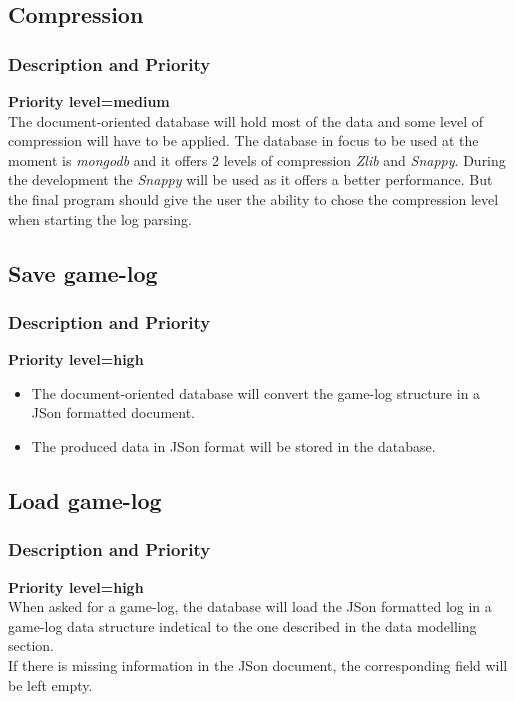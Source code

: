 \documentclass{scrreprt}
\begin{document}
\subsection{Compression}
\subsubsection{Description and Priority}
\textbf{Priority level=medium}\\
The document-oriented database will hold most of the data and some level of compression
will have to be applied.
The database in focus to be used at the moment is \textit{mongodb} and it offers
2 levels of compression \textit{Zlib} and \textit{Snappy}.
During the development the \textit{Snappy} will be used as it offers a better
performance.
But the final program should give the user the ability to chose the compression
level when starting the log parsing.


\subsection{Save game-log}
\subsubsection{Description and Priority}
\textbf{Priority level=high}\\
\begin{itemize}
\item The document-oriented database will convert the game-log structure in a JSon formatted document.
\item The produced data in JSon format will be stored in the database.
\end{itemize}

\subsection{Load game-log}
\subsubsection{Description and Priority}
\textbf{Priority level=high}\\
When asked for a game-log, the database will load the JSon formatted log in a game-log data structure indetical to the one described in the data modelling section.\\
If there is missing information in the JSon document, the corresponding field will be left empty.
\end{document}
